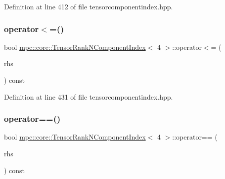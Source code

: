 Definition at line 412 of file tensorcomponentindex.\+hpp.

\mbox{\label{classmpc_1_1core_1_1_tensor_rank_n_component_index_3_014_01_4_a8b769dced61936469fae1927250b29cb}} 
\subsubsection{\texorpdfstring{operator$<$=()}{operator<=()}}
{\footnotesize\ttfamily bool \mbox{\hyperlink{classmpc_1_1core_1_1_tensor_rank_n_component_index}{mpc\+::core\+::\+Tensor\+Rank\+N\+Component\+Index}}$<$ 4 $>$\+::operator$<$= (\begin{DoxyParamCaption}\item[{const \mbox{\hyperlink{classmpc_1_1core_1_1_tensor_rank_n_component_index}{Tensor\+Rank\+N\+Component\+Index}}$<$ 4 $>$ \&}]{rhs }\end{DoxyParamCaption}) const\hspace{0.3cm}{\ttfamily [inline]}}



Definition at line 431 of file tensorcomponentindex.\+hpp.

\mbox{\label{classmpc_1_1core_1_1_tensor_rank_n_component_index_3_014_01_4_a0f011e4894f2c385c30c64fcba648d0d}} 
\subsubsection{\texorpdfstring{operator==()}{operator==()}}
{\footnotesize\ttfamily bool \mbox{\hyperlink{classmpc_1_1core_1_1_tensor_rank_n_component_index}{mpc\+::core\+::\+Tensor\+Rank\+N\+Component\+Index}}$<$ 4 $>$\+::operator== (\begin{DoxyParamCaption}\item[{const \mbox{\hyperlink{classmpc_1_1core_1_1_tensor_rank_n_component_index}{Tensor\+Rank\+N\+Component\+Index}}$<$ 4 $>$ \&}]{rhs }\end{DoxyParamCaption}) const\hspace{0.3cm}{\ttfamily [inline]}}



